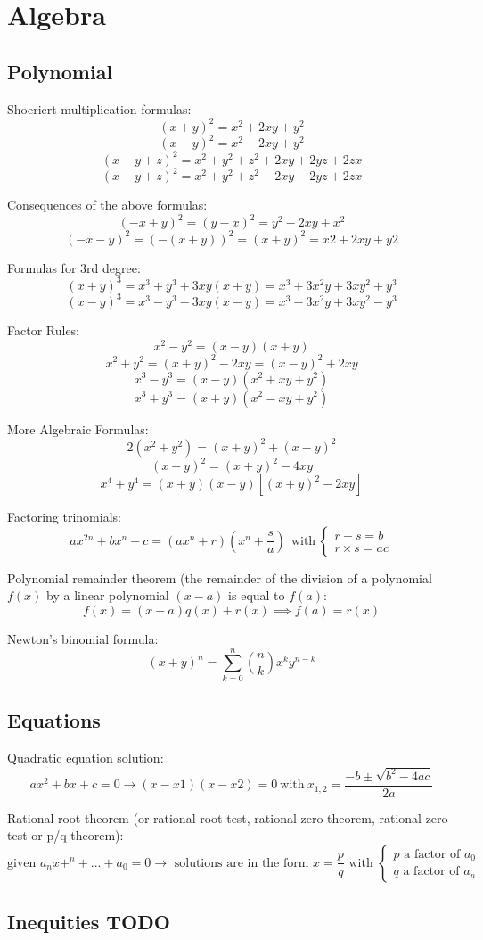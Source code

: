 \chapter{Algebra}

\section{Polynomial}
Shoeriert multiplication formulas:
$$(x + y)^2 = x^2 + 2xy + y^2$$
$$(x - y)^2 = x^2 - 2xy + y^2$$ 
$$(x + y + z)^2 = x^2 + y^2 + z^2 + 2xy + 2yz + 2zx$$ 
$$(x - y + z)^2 = x^2 + y^2 + z^2 - 2xy - 2yz + 2zx$$ 

Consequences of the above formulas:
$$(-x + y)^2 = (y - x)^2 = y^2 - 2xy + x^2$$
$$(-x - y)^2 = (-(x + y))^2 = (x + y)^2 = x2 + 2xy + y2$$

Formulas for 3rd degree:
$$(x + y)^3 = x^3 + y^3 + 3xy(x + y) = x^3 + 3x^2y + 3xy^2 + y^3$$
$$(x - y)^3 = x^3 - y^3 - 3xy(x - y) = x^3 - 3x^2y + 3xy^2 - y^3$$

Factor Rules:
$$x^2 - y^2 = (x - y)(x + y)$$
$$x^2 + y^2 = (x + y)^2 - 2xy = (x - y)^2 + 2xy$$
$$x^3 - y^3 = (x - y)(x^2 + xy + y^2)$$
$$x^3 + y^3 = (x + y)(x^2 - xy + y^2)$$

More Algebraic Formulas:
$$2(x^2 + y^2) = (x + y)^2 + (x - y)^2$$
$$(x - y)^2 = (x + y)^2 - 4xy$$
$$x^4 + y^4 = (x + y)(x - y)[(x + y)^2 - 2xy]$$

Factoring trinomials:
$$ ax^{2n} + bx^n + c = (ax^n + r)(x^n + \frac{s}{a}) ~~ \text{with} ~ \begin{cases} 
                                                                  r + s = b \\
                                                                  r \times s = ac
                                                                 \end{cases}
$$

Polynomial remainder theorem (the remainder of the division of a polynomial $f(x)$ by a linear polynomial ${(x-a)}$ is equal to $f(a)$:
$$ f(x) = (x-a)q(x) + r(x) \implies f(a) = r(x) $$

Newton's binomial formula:
\[ (x+y)^n = \sum_{k=0}^{n}\binom{n}{k}x^ky^{n-k} \]

\section{Equations}
Quadratic equation solution:
$$ ax^2 + bx + c = 0 \rightarrow (x - x1)(x - x2) = 0 ~\text{with}~ x_{1,2}=\frac{-b\pm\sqrt{b^2-4ac}}{2a}$$

Rational root theorem (or rational root test, rational zero theorem, rational zero test or p/q theorem): 
$$
\text{given } a_nx+^n+...+a_0=0 \rightarrow \text{ solutions are in the form } x=\frac{p}{q} \text{ with } \begin{cases}
p \text{ a factor of } a_0 \\
q \text{ a factor of } a_n
\end{cases}
$$


\section{Inequities TODO}
